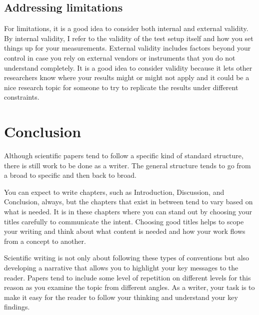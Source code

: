 \subsection{Addressing limitations}

For limitations, it is a good idea to consider both internal and external validity.
By internal validity, I refer to the validity of the test setup itself and how you set things up for your measurements.
External validity includes factors beyond your control in case you rely on external vendors or instruments that you do not understand completely.
It is a good idea to consider validity because it lets other researchers know where your results might or might not apply and it could be a nice research topic for someone to try to replicate the results under different constraints.

\begin{comment}
\section{How to write a Conclusion chapter}

Compared to Discussion, Conclusion is generally a faster one to write as it does not have to achieve a lot.
The purpose of Conclusion is the opposite of Introduction as instead of bringing a reader to the topic, you bring them out of the topic.
A typical way to write a Conclusion is to remind the reader of the problem and even write out your research questions, explain your main findings in several paragraphs, and show the open problems.
\end{comment}

\section{Conclusion}

Although scientific papers tend to follow a specific kind of standard structure, there is still work to be done as a writer.
The general structure tends to go from a broad to specific and then back to broad.

You can expect to write chapters, such as Introduction, Discussion, and Conclusion, always, but the chapters that exist in between tend to vary based on what is needed.
It is in these chapters where you can stand out by choosing your titles carefully to communicate the intent.
Choosing good titles helps to scope your writing and think about what content is needed and how your work flows from a concept to another.

Scientific writing is not only about following these types of conventions but also developing a narrative that allows you to highlight your key messages to the reader.
Papers tend to include some level of repetition on different levels for this reason as you examine the topic from different angles.
As a writer, your task is to make it easy for the reader to follow your thinking and understand your key findings.

